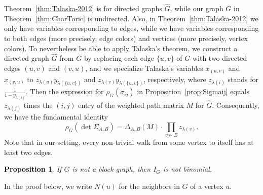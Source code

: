 \documentclass[a4paper, 11pt]{amsart}
\numberwithin{theorem}{section}
\newtheorem{proposition}[theorem]{Proposition}
\newcommand{\aG}{\widehat{G}}
\begin{document}
Theorem~\ref{thm:Talaska-2012} is for directed graphs $\aG$,
while our graph $G$ in Theorem~\ref{thm:CharToric} is undirected. Also,
in Theorem~\ref{thm:Talaska-2012} we only have variables corresponding
to edges, while we have variables corresponding to both edges (more
precisely, edge colors) and vertices (more precisely, vertex colors).
To nevertheless be able to apply Talaska's theorem, we construct a
directed graph $\aG$ from $G$ by replacing each edge $\{u,v\}$ of $G$ 
with two directed edges $(u,v)$ and $(v,u)$, and we specialize Talaska's variables
$x_{(u,v)}$ and $x_{(v,u)}$ to $z_{\lambda(u)} y_{\lambda(\{u,v\})}$ and
$z_{\lambda(v)} y_{\lambda(\{u,v\})}$, respectively, where $z_{\lambda(i)}$
stands for $\frac{1}{1-y_{\lambda(i)}}$. Then the expression for
$\rho_G(\sigma_{ij})$ in Proposition~\ref{prop:Sigmaij} equals
$z_{\lambda(j)}$ times the $(i,j)$ entry of the weighted path matrix $M$ for 
$\aG$. Consequently, we have the fundamental identity 
\[ \rho_G(\det\Sigma_{A,B}) = \Delta_{A,B}(M)\cdot \prod_{v\in B}
z_{\lambda(v)}. \]
Note that in our setting, every non-trivial walk from some vertex to itself has at least two edges.

\begin{proposition} \label{prop:Block}
    If $G$ is not a block graph, then $I_G$ is not binomial.
\end{proposition}

In the proof below, we write $N(u)$ for the neighbors in $G$ of a
vertex $u$.
\end{document}
